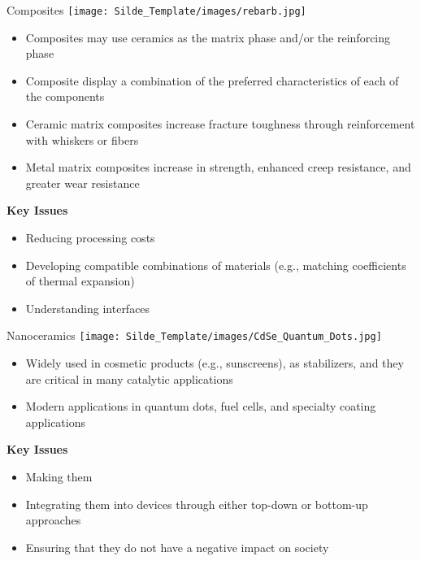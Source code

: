 \documentclass{libs/XJTLU_format}
\begin{document}
\begin{frame}{Composites}
    \centering
    \texttt{[image: Silde\_Template/images/rebarb.jpg]}
\begin{itemize}
    \item Composites may use ceramics as the matrix phase and/or the reinforcing phase \pause
    \item Composite display a combination of the preferred characteristics of each of the components \pause
    \item Ceramic matrix composites increase fracture toughness through reinforcement with whiskers or fibers \pause
    \item Metal matrix composites increase in strength, enhanced creep resistance, and greater wear resistance \pause
\end{itemize}

\textbf{Key Issues}
\begin{itemize}
    \item Reducing processing costs
    \item Developing compatible combinations of materials (e.g., matching coefficients of thermal expansion)
    \item Understanding interfaces
\end{itemize}

\end{frame}

\begin{frame}{Nanoceramics}
\centering
\texttt{[image: Silde\_Template/images/CdSe\_Quantum\_Dots.jpg]}
\begin{itemize}
    \item Widely used in cosmetic products (e.g., sunscreens), as stabilizers, and they are critical in many catalytic applications \pause
    \item Modern applications in quantum dots, fuel cells, and specialty coating applications \pause
\end{itemize}

\textbf{Key Issues}
\begin{itemize}
    \item Making them
    \item Integrating them into devices through either top-down or bottom-up approaches
    \item Ensuring that they do not have a negative impact on society
\end{itemize}

\end{frame}
\end{document}
